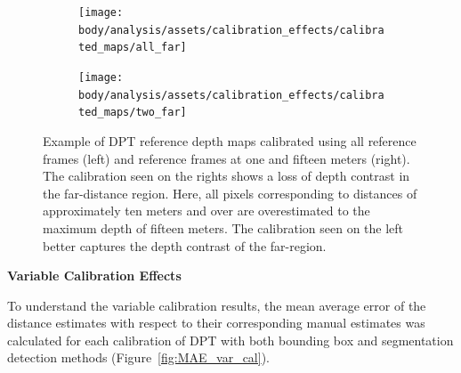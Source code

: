 \begin{figure}[H]
    \centering
    \begin{subfigure}[t]{0.48\textwidth}
        \centering
        \texttt{[image: body/analysis/assets/calibration\_effects/calibrated\_maps/all\_far]}
    \end{subfigure}
    \begin{subfigure}[t]{0.48\textwidth}
        \centering
        \texttt{[image: body/analysis/assets/calibration\_effects/calibrated\_maps/two\_far]}
    \end{subfigure}

    \caption{Example of DPT reference depth maps calibrated using all reference frames (left) and reference
        frames at one and fifteen meters (right). The calibration seen on the rights shows a loss of depth
        contrast in the far-distance region. Here, all pixels corresponding to distances of approximately ten
        meters and over are overestimated to the maximum depth of fifteen meters. The calibration seen on the
        left better captures the depth contrast of the far-region.}
    \label{fig:far_scale}
\end{figure}



%
%


\clearpage

\vspace{5mm}
\textbf{Variable Calibration Effects}

To understand the variable calibration results, the mean average error of the distance estimates
with respect to their corresponding manual estimates was calculated for each calibration
of DPT with both bounding box and segmentation detection methods (Figure~\ref{fig:MAE_var_cal}).

